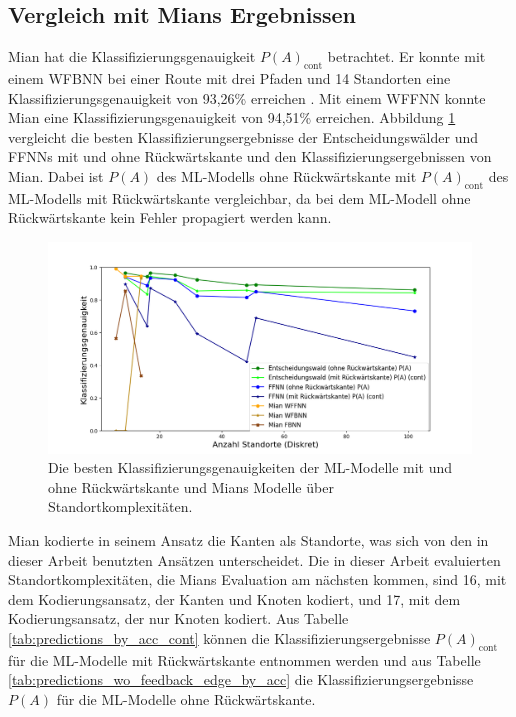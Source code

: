 \subsection{Vergleich mit Mians Ergebnissen}
Mian hat die Klassifizierungsgenauigkeit $P(A)_{\text{cont}}$ betrachtet.
Er konnte mit einem WFBNN bei einer Route mit drei Pfaden und 14 Standorten eine Klassifizierungsgenauigkeit von 93,26\% erreichen \cite{naveedThesis}.
Mit einem WFFNN konnte Mian eine Klassifizierungsgenauigkeit von 94,51\% erreichen.
Abbildung \ref{fig:best_dt_vs_knn_fb_vs_no_fb} vergleicht die besten Klassifizierungsergebnisse der Entscheidungswälder und FFNNs
mit und ohne Rückwärtskante und den Klassifizierungsergebnissen von Mian.
Dabei ist $P(A)$ des ML-Modells ohne Rückwärtskante mit $P(A)_{\text{cont}}$ des ML-Modells mit Rückwärtskante vergleichbar,
da bei dem ML-Modell ohne Rückwärtskante kein Fehler propagiert werden kann.
\begin{figure}[h!]
    \centering
    \includegraphics[width=\linewidth]{images/best_dt_vs_knn_fb_vs_no_fb.png}
    \caption{Die besten Klassifizierungsgenauigkeiten der ML-Modelle mit und ohne Rückwärtskante und Mians Modelle über Standortkomplexitäten.}
    \label{fig:best_dt_vs_knn_fb_vs_no_fb}
\end{figure}
\newline
\newline
Mian kodierte in seinem Ansatz die Kanten als Standorte, was sich von den in dieser Arbeit benutzten Ansätzen unterscheidet.
Die in dieser Arbeit evaluierten Standortkomplexitäten, die Mians Evaluation am nächsten kommen, sind 16, mit dem Kodierungsansatz, der Kanten und Knoten kodiert,
und 17, mit dem Kodierungsansatz, der nur Knoten kodiert.
\newpage
Aus Tabelle \ref{tab:predictions_by_acc_cont} können die Klassifizierungsergebnisse $P(A)_{\text{cont}}$ für die ML-Modelle mit Rückwärtskante entnommen werden
und aus Tabelle \ref{tab:predictions_wo_feedback_edge_by_acc} die Klassifizierungsergebnisse $P(A)$ für die ML-Modelle ohne Rückwärtskante.
